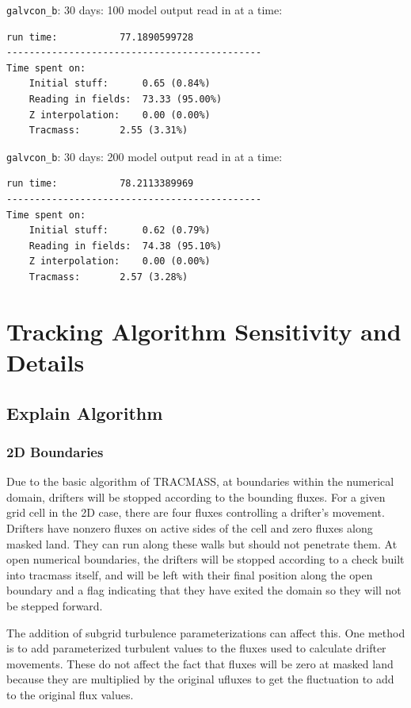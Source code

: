 \documentclass[11pt]{article}
\begin{document}
\verb+galvcon_b+: 30 days: 100 model output read in at a time: \\
\begin{verbatim}
run time:           77.1890599728
---------------------------------------------
Time spent on:
    Initial stuff:      0.65 (0.84%)
    Reading in fields:  73.33 (95.00%)
    Z interpolation:    0.00 (0.00%)
    Tracmass:       2.55 (3.31%)
\end{verbatim}

\verb+galvcon_b+: 30 days: 200 model output read in at a time: \\
\begin{verbatim}
run time:           78.2113389969
---------------------------------------------
Time spent on:
    Initial stuff:      0.62 (0.79%)
    Reading in fields:  74.38 (95.10%)
    Z interpolation:    0.00 (0.00%)
    Tracmass:       2.57 (3.28%)
\end{verbatim}

\section{Tracking Algorithm Sensitivity and Details}

\subsection{Explain Algorithm}

\subsubsection{2D Boundaries}

Due to the basic algorithm of TRACMASS, at boundaries within the numerical domain, drifters will be stopped according to the bounding fluxes. For a given grid cell in the 2D case, there are four fluxes controlling a drifter's movement. Drifters have nonzero fluxes on active sides of the cell and zero fluxes along masked land. They can run along these walls but should not penetrate them. At open numerical boundaries, the drifters will be stopped according to a check built into tracmass itself, and will be left with their final position along the open boundary and a flag indicating that they have exited the domain so they will not be stepped forward.

The addition of subgrid turbulence parameterizations can affect this. One method is to add parameterized turbulent values to the fluxes used to calculate drifter movements. These do not affect the fact that fluxes will be zero at masked land because they are multiplied by the original ufluxes to get the fluctuation to add to the original flux values.
\end{document}
